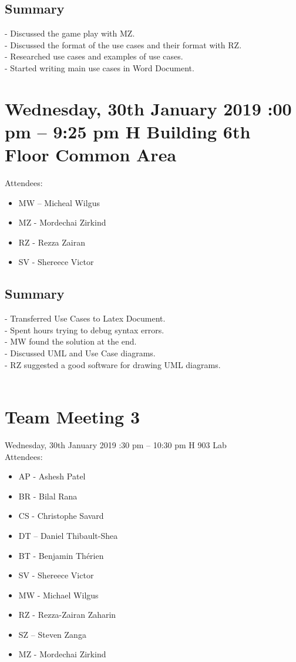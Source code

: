 \documentclass[12pt]{article}
\begin{document}
\subsection{Summary}
-	Discussed the game play with MZ. \\
-	Discussed the format of the use cases and their format with RZ. \\
-	Researched use cases and examples of use cases. \\
-	Started writing main use cases in Word Document. \\

\pagebreak 
\section{Wednesday, 30th January 2019 :00 pm – 9:25 pm \textbar H Building 6th Floor Common Area  }

Attendees: 
\begin{itemize}
	\item MW – Micheal Wilgus
	\item MZ - Mordechai Zirkind  
	\item RZ - Rezza Zairan 
	\item SV - Shereece Victor
\end{itemize}
 

\subsection{Summary}
-	Transferred Use Cases to Latex Document.\\
-	Spent hours trying to debug syntax errors.\\
-	MW found the solution at the end.\\
-	Discussed UML and Use Case diagrams.\\
-	RZ suggested a good software for drawing UML diagrams.\\ \\



\section{Team Meeting 3 }

Wednesday, 30th January 2019 :30 pm – 10:30 pm \textbar H 903 Lab\\
Attendees: 

\begin{itemize}
	\item AP - Ashesh Patel
	\item BR - Bilal Rana
	\item CS - Christophe Savard
	\item DT – Daniel Thibault-Shea
	\item BT - Benjamin Th\'erien
	\item SV - Shereece Victor
	\item MW - Michael Wilgus
	\item RZ - Rezza-Zairan Zaharin
	\item SZ – Steven Zanga
	\item MZ - Mordechai Zirkind
\end{itemize}
\end{document}
